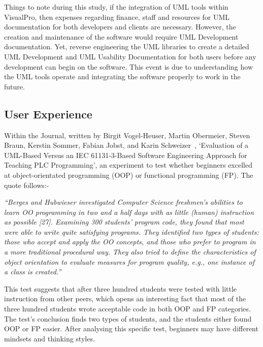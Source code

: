 \documentclass[12pt]{report} %
\begin{document}
			Things to note during this study, if the integration of UML tools within VisualPro, then expenses regarding finance, staff and resources for UML documentation for both developers and clients are necessary. However, the creation and maintenance of the software would require UML Development documentation. Yet, reverse engineering the UML libraries to create a detailed UML Development and UML Usability Documentation for both users before any development can begin on the software. This event is due to understanding how the UML tools operate and integrating the software properly to work in the future.

		\subsection{User Experience}
		\label{subsec:userExperience}
			Within the Journal, written by Birgit Vogel-Heuser, Martin Obermeier, Steven Braun, Kerstin Sommer, Fabian Jobst, and Karin Schweizer~\cite{vogel-heuser_evaluation_2013}, `Evaluation of a UML-Based Versus an IEC 61131-3-Based Software Engineering Approach for Teaching PLC Programming', an experiment to test whether beginners excelled at object-orientated programming (OOP) or functional programming (FP). The quote follows:-

			\begin{center}
			\textit{``Berges and Hubwieser investigated Computer Science freshmen’s abilities to learn OO programming in two and a half days with as little (human) instruction as possible [27]. Examining 300 students’ program code, they found that most were able to write quite satisfying programs. They identified two types of students: those who accept and apply the OO concepts, and those who prefer to program in a more traditional procedural way. They also tried to define the characteristics of object orientation to evaluate measures for program quality, e.g., one instance of a class is created.''}~\cite{vogel-heuser_evaluation_2013}
			\end{center}

			This test suggests that after three hundred students were tested with little instruction from other peers, which opens an interesting fact that most of the three hundred students wrote acceptable code in both OOP and FP categories. The test's conclusion finds two types of students, and the students either found OOP or FP easier. After analysing this specific test, beginners may have different mindsets and thinking styles.
			
\end{document}
